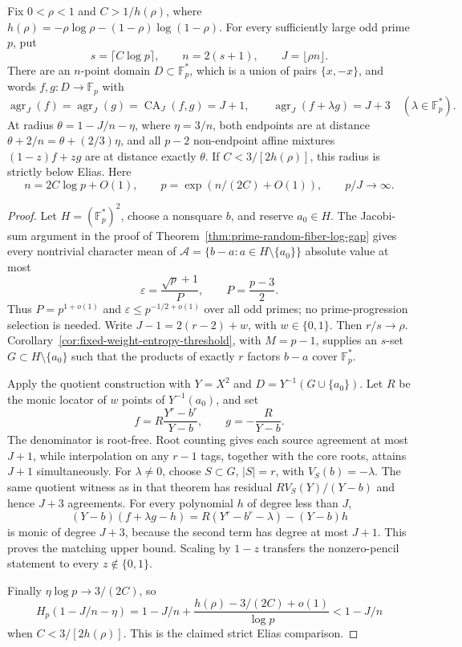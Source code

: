 \begin{corollary}
\label{cor:two-point-fiber-all-primes}
Fix $0<\rho<1$ and $C>1/h(\rho)$, where
$h(\rho)=-\rho\log\rho-(1-\rho)\log(1-\rho)$.
For every sufficiently large odd prime $p$, put
\[
 s=\lceil C\log p\rceil,\qquad n=2(s+1),\qquad
 J=\lfloor\rho n\rfloor.
\]
There are an $n$-point domain $D\subset\mathbb F_p^*$, which is a
union of pairs $\{x,-x\}$, and words $f,g:D\to\mathbb F_p$ with
\[
 \operatorname{agr}_J(f)=\operatorname{agr}_J(g)
 =\operatorname{CA}_J(f,g)=J+1,
 \qquad
 \operatorname{agr}_J(f+\lambda g)=J+3
 \quad(\lambda\in\mathbb F_p^*).
\]
At radius $\theta=1-J/n-\eta$, where $\eta=3/n$, both endpoints
are at distance $\theta+2/n=\theta+(2/3)\eta$, and all $p-2$
non-endpoint affine mixtures $(1-z)f+zg$ are at distance exactly
$\theta$.  If $C<3/[2h(\rho)]$, this radius is strictly below Elias.
Here
\[
 n=2C\log p+O(1),\qquad p=\exp\!\left(n/(2C)+O(1)\right),
 \qquad p/J\longrightarrow\infty.
\]
\end{corollary}
\begin{proof}
Let $H=(\mathbb F_p^*)^2$, choose a nonsquare $b$, and reserve
$a_0\in H$.  The Jacobi-sum argument in the proof of
Theorem~\ref{thm:prime-random-fiber-log-gap} gives every nontrivial
character mean of $\mathcal A=\{b-a:a\in H\setminus\{a_0\}\}$
absolute value at most
\[
 \varepsilon=\frac{\sqrt p+1}{P},\qquad P=\frac{p-3}{2}.
\]
Thus $P=p^{1+o(1)}$ and $\varepsilon\le p^{-1/2+o(1)}$ over
all odd primes; no prime-progression selection is needed.
Write $J-1=2(r-2)+w$, with $w\in\{0,1\}$.  Then $r/s\to\rho$.
Corollary~\ref{cor:fixed-weight-entropy-threshold}, with $M=p-1$,
supplies an $s$-set $G\subset H\setminus\{a_0\}$ such that the
products of exactly $r$ factors $b-a$ cover $\mathbb F_p^*$.

Apply the quotient construction with $Y=X^2$ and
$D=Y^{-1}(G\cup\{a_0\})$.  Let $R$ be the monic locator of $w$
points of $Y^{-1}(a_0)$, and set
\[
 f=R\frac{Y^r-b^r}{Y-b},\qquad g=-\frac R{Y-b}.
\]
The denominator is root-free.  Root counting gives each source
agreement at most $J+1$, while interpolation on any $r-1$ tags,
together with the core roots, attains $J+1$ simultaneously.
For $\lambda\ne0$, choose $S\subset G$, $|S|=r$, with
$V_S(b)=-\lambda$.  The same quotient witness as in that theorem
has residual $RV_S(Y)/(Y-b)$ and hence $J+3$ agreements.
For every polynomial $h$ of degree less than $J$,
\[
 (Y-b)(f+\lambda g-h)
 =R(Y^r-b^r-\lambda)-(Y-b)h
\]
is monic of degree $J+3$, because the second term has degree at most
$J+1$.  This proves the matching upper bound.  Scaling by $1-z$
transfers the nonzero-pencil statement to every $z\notin\{0,1\}$.

Finally $\eta\log p\to3/(2C)$, so
\[
 H_p(1-J/n-\eta)
 =1-J/n+\frac{h(\rho)-3/(2C)+o(1)}{\log p}
 <1-J/n
\]
when $C<3/[2h(\rho)]$.  This is the claimed strict Elias comparison.
\end{proof}
